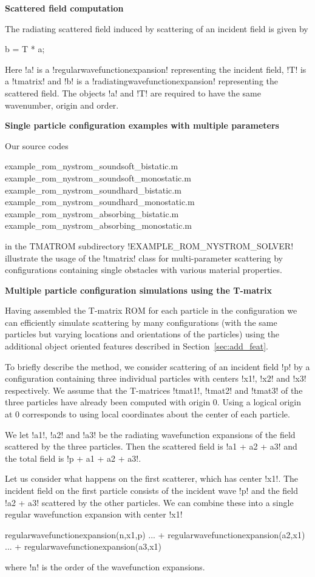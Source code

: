 \documentclass[12pt,letterpaper,final]{article}
\newcommand{\techheading}[1]{%
    \par\vspace{-0.3\parskip}\noindent\hspace{-1cm}\textbf{#1}%
    \par\vspace{-0.5\parskip}\noindent\nopagebreak\ignorespaces}
\begin{document}
\techheading{Scattered field computation}
The radiating 
scattered field induced by scattering of an incident field is given by
\begin{matlab}
b = T * a;
\end{matlab}
Here !a! is a !regularwavefunctionexpansion! representing the incident field,
!T! is a !tmatrix!
and !b! is a !radiatingwavefunctionexpansion! representing the scattered field.
The objects !a! and !T! are required to have the same wavenumber,
origin and order.

\techheading{Single particle configuration examples with multiple parameters}
Our source codes
\begin{matlab}
example_rom_nystrom_soundsoft_bistatic.m
example_rom_nystrom_soundsoft_monostatic.m 
example_rom_nystrom_soundhard_bistatic.m
example_rom_nystrom_soundhard_monostatic.m 
example_rom_nystrom_absorbing_bistatic.m
example_rom_nystrom_absorbing_monostatic.m 
\end{matlab}
in the TMATROM subdirectory !EXAMPLE_ROM_NYSTROM_SOLVER! 
illustrate the usage of the !tmatrix! class for multi-parameter scattering
by configurations containing single obstacles with 
various material properties. 

\techheading{Multiple particle configuration simulations using the T-matrix}
Having assembled the T-matrix ROM for each particle in the configuration
we can efficiently simulate scattering by many configurations 
(with the same particles but varying locations and orientations of the particles)
using the additional object oriented features described
in Section~\ref{sec:add_feat}.

To briefly describe the method, we 
consider scattering of an incident field !p! by a configuration
containing three individual particles with centers !x{1}!, !x{2}!
and !x{3}! respectively.
We assume that the T-matrices 
!tmat{1}!, !tmat{2}! and !tmat{3}!
of the three particles have already been computed with origin 0.
Using a logical origin at 0 
corresponds to using local coordinates about the center of each particle.

We let 
!a{1}!, !a{2}! and !a{3}! be the radiating wavefunction expansions of the 
field scattered by the three particles.
Then the scattered field is !a{1} + a{2} + a{3}! and the total field is
!p + a{1} + a{2} + a{3}!.

Let us consider what happens on the first scatterer, which has center
!x{1}!.
The incident field on the first particle consists of the incident wave !p!
and the field !a{2} + a{3}! scattered by the other particles.
We can combine these into a single regular wavefunction expansion with 
center !x{1}!
\begin{matlab}
regularwavefunctionexpansion(n,x{1},p) ...
       + regularwavefunctionexpansion(a{2},x{1}) ...
       + regularwavefunctionexpansion(a{3},x{1})
\end{matlab}
where !n! is the order of the wavefunction expansions.
\end{document}
